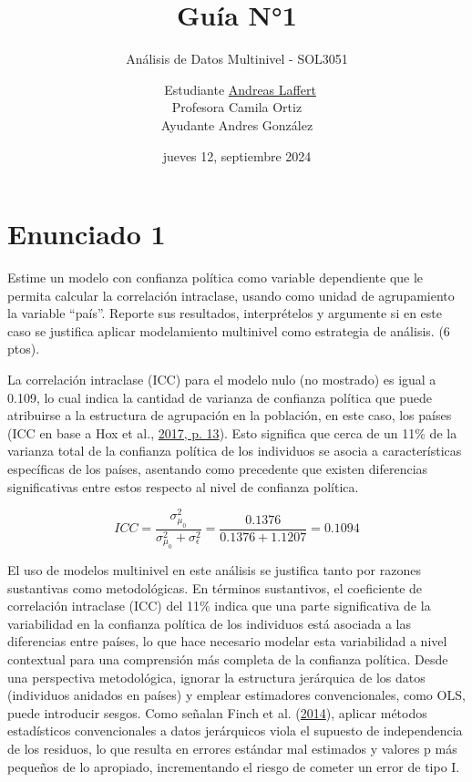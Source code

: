 \documentclass[
  12pt,
  a4paper,
]{article}
\title{\vspace{5cm} Guía N°1}
\subtitle{Análisis de Datos Multinivel - SOL3051}
\author{~Estudiante \href{mailto:alaffertt@estudiante.uc.cl}{Andreas Laffert}\\
\hspace*{0.333em}Profesora Camila Ortiz\\
Ayudante Andres González\\
\vspace{8cm}}
\date{jueves 12, septiembre 2024}
\begin{document}
\maketitle

\pagebreak

\hypertarget{enunciado-1}{%
\section{Enunciado 1}\label{enunciado-1}}

Estime un modelo con confianza política como variable dependiente que le permita calcular la correlación intraclase, usando como unidad de agrupamiento la variable ``país''. Reporte sus resultados, interprételos y argumente si en este caso se justifica aplicar modelamiento multinivel como estrategia de análisis. (6 ptos).

La correlación intraclase (ICC) para el modelo nulo (no mostrado) es igual a 0.109, lo cual indica la cantidad de varianza de confianza política que puede atribuirse a la estructura de agrupación en la población, en este caso, los países (ICC en base a Hox et al., \protect\hyperlink{ref-hox_multilevel_2017a}{2017, p. 13}). Esto significa que cerca de un 11\% de la varianza total de la confianza política de los individuos se asocia a características específicas de los países, asentando como precedente que existen diferencias significativas entre estos respecto al nivel de confianza política.

\[ICC = \frac{\sigma^2_{\mu_0}}{\sigma^2_{\mu_0} + \sigma^2_{\epsilon}} = \frac{0.1376}{0.1376+ 1.1207} = 0.1094\]

El uso de modelos multinivel en este análisis se justifica tanto por razones sustantivas como metodológicas. En términos sustantivos, el coeficiente de correlación intraclase (ICC) del 11\% indica que una parte significativa de la variabilidad en la confianza política de los individuos está asociada a las diferencias entre países, lo que hace necesario modelar esta variabilidad a nivel contextual para una comprensión más completa de la confianza política. Desde una perspectiva metodológica, ignorar la estructura jerárquica de los datos (individuos anidados en países) y emplear estimadores convencionales, como OLS, puede introducir sesgos. Como señalan Finch et al. (\protect\hyperlink{ref-finch_multilevel_2014}{2014}), aplicar métodos estadísticos convencionales a datos jerárquicos viola el supuesto de independencia de los residuos, lo que resulta en errores estándar mal estimados y valores p más pequeños de lo apropiado, incrementando el riesgo de cometer un error de tipo I.
\end{document}
